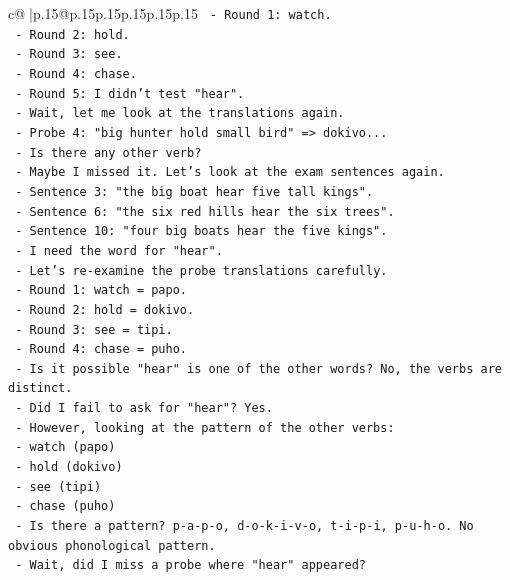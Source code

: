 \documentclass{article}
\begin{document}
{\begin{supertabular}{c@{$\;$}|p{.15\linewidth}@{}p{.15\linewidth}p{.15\linewidth}p{.15\linewidth}p{.15\linewidth}p{.15\linewidth}}
{{{\texttt{     {-} Round 1: watch.} \\
\texttt{     {-} Round 2: hold.} \\
\texttt{     {-} Round 3: see.} \\
\texttt{     {-} Round 4: chase.} \\
\texttt{     {-} Round 5: I didn't test "hear".} \\
\texttt{     {-} Wait, let me look at the translations again.} \\
\texttt{     {-} Probe 4: "big hunter hold small bird" => dokivo...} \\
\texttt{     {-} Is there any other verb?} \\
\texttt{     {-} Maybe I missed it. Let's look at the exam sentences again.} \\
\texttt{     {-} Sentence 3: "the big boat hear five tall kings".} \\
\texttt{     {-} Sentence 6: "the six red hills hear the six trees".} \\
\texttt{     {-} Sentence 10: "four big boats hear the five kings".} \\
\texttt{     {-} I need the word for "hear".} \\
\texttt{     {-} Let's re{-}examine the probe translations carefully.} \\
\texttt{     {-} Round 1: watch = papo.} \\
\texttt{     {-} Round 2: hold = dokivo.} \\
\texttt{     {-} Round 3: see = tipi.} \\
\texttt{     {-} Round 4: chase = puho.} \\
\texttt{     {-} Is it possible "hear" is one of the other words? No, the verbs are distinct.} \\
\texttt{     {-} Did I fail to ask for "hear"? Yes.} \\
\texttt{     {-} However, looking at the pattern of the other verbs:} \\
\texttt{       {-} watch (papo)} \\
\texttt{       {-} hold (dokivo)} \\
\texttt{       {-} see (tipi)} \\
\texttt{       {-} chase (puho)} \\
\texttt{     {-} Is there a pattern? p{-}a{-}p{-}o, d{-}o{-}k{-}i{-}v{-}o, t{-}i{-}p{-}i, p{-}u{-}h{-}o. No obvious phonological pattern.} \\
\texttt{     {-} Wait, did I miss a probe where "hear" appeared?} \\
}}}
\end{supertabular}}
\end{document}
